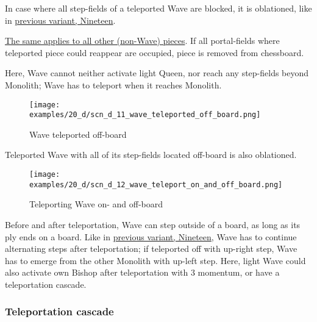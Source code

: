In case where all step-fields of a teleported Wave are blocked, it is oblationed, like in
\hyperref[fig:scn_n_06_teleport_wave_blocked]{previous variant, Nineteen}.

\hyperref[fig:scn_n_03_teleport_move_2]{The same applies to all other (non-Wave) pieces}.
If all portal-fields where teleported piece could reappear are occupied, piece is removed
from chessboard.

Here, Wave cannot neither activate light Queen, nor reach any step-fields beyond Monolith;
Wave has to teleport when it reaches Monolith.

\clearpage %

\noindent
\begin{figure}[!h]
\texttt{[image: examples/20\_d/scn\_d\_11\_wave\_teleported\_off\_board.png]}
\caption{Wave teleported off-board}
\label{fig:scn_d_11_wave_teleported_off_board}
\end{figure}

Teleported Wave with all of its step-fields located off-board is also oblationed.

\clearpage %

\noindent
\begin{figure}[!h]
\texttt{[image: examples/20\_d/scn\_d\_12\_wave\_teleport\_on\_and\_off\_board.png]}
\caption{Teleporting Wave on- and off-board}
\label{fig:scn_d_12_wave_teleport_on_and_off_board}
\end{figure}

Before and after teleportation, Wave can step outside of a board, as long as its ply ends
on a board. Like in \hyperref[fig:scn_n_08_teleport_wave_end]{previous variant, Nineteen},
Wave has to continue alternating steps after teleportation; if teleported off with up-right
step, Wave has to emerge from the other Monolith with up-left step. Here, light Wave could
also activate own Bishop after teleportation with 3 momentum, or have a teleportation cascade.

\clearpage %

\subsubsection*{Teleportation cascade}

